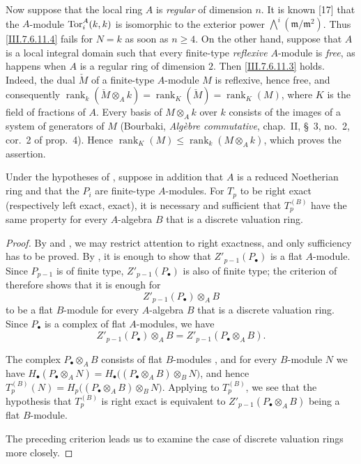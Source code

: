 {\begin{remarks}[7.6.11]
Now suppose that the local ring $A$ is \emph{regular} of dimension
$n$.  It is known [17] that the $A$-module
$\operatorname{Tor}_i^A(k,k)$ is isomorphic to the exterior power $\bigwedge\nolimits^i(\mathfrak m/\mathfrak m^2)$.
Thus \eqref{III.7.6.11.4} fails for $N=k$ as soon as
$n\geq4$.  On the other hand, suppose that $A$ is a local
integral domain such that every finite-type \emph{reflexive}
$A$-module is \emph{free}, as happens when $A$ is a regular ring of
dimension $2$.  Then \eqref{III.7.6.11.3} holds.  Indeed, the
dual $\check M$ of a finite-type $A$-module $M$ is reflexive,
hence free, and consequently $\operatorname{rank}_k(\check M\otimes_A k)
=
\operatorname{rank}_K(\check M)
=
\operatorname{rank}_K(M)$,
where $K$ is the field of fractions of $A$.  Every basis of
$M\otimes_A k$ over $k$ consists of the images of a system of
generators of $M$ (Bourbaki, \emph{Alg\`ebre commutative},
chap.~II, \S~3, no.~2, cor.~2 of prop.~4).  Hence $\operatorname{rank}_K(M)
\leq
\operatorname{rank}_k(M\otimes_A k)$,
which proves the assertion.
\end{remarks}
}

\begin{proposition}[7.6.2]
\label{III.7.6.2}
Under the hypotheses of , suppose in addition
that $A$ is a reduced Noetherian ring and that the $P_i$ are
finite-type $A$-modules.  For $T_p$ to be right exact
\textup{(respectively} left exact, exact), it is necessary and
sufficient that $T_p^{(B)}$ have the same property for every
$A$-algebra $B$ that is a discrete valuation ring.
\end{proposition}

\begin{proof}
By  and , we may restrict
attention to right exactness, and only sufficiency has to be
proved.  By , it is enough to show that
$Z'_{p-1}(P_\bullet)$ is a flat $A$-module.  Since
$P_{p-1}$ is of finite type, $Z'_{p-1}(P_\bullet)$ is also of
finite type; the criterion of  therefore
shows that it is enough for
\[
  Z'_{p-1}(P_\bullet)\otimes_A B
\]
to be a flat $B$-module for every $A$-algebra $B$ that is a
discrete valuation ring.  Since $P_\bullet$ is a complex of
flat $A$-modules, we have
\[
  Z'_{p-1}(P_\bullet)\otimes_A B
  =
  Z'_{p-1}(P_\bullet\otimes_A B).
\]

The complex $P_\bullet\otimes_A B$ consists of flat
$B$-modules , and for every $B$-module $N$
we have $H_\bullet(P_\bullet\otimes_A N)
=
H_\bullet\bigl((P_\bullet\otimes_A B)\otimes_B N\bigr)$,
and hence $T_p^{(B)}(N)
=
H_p\bigl((P_\bullet\otimes_A B)\otimes_B N\bigr)$.
Applying  to $T_p^{(B)}$, we see that the
hypothesis that $T_p^{(B)}$ is right exact is equivalent to
$Z'_{p-1}(P_\bullet\otimes_A B)$ being a flat $B$-module.

The preceding criterion leads us to examine the case of
discrete valuation rings more closely.
\end{proof}

